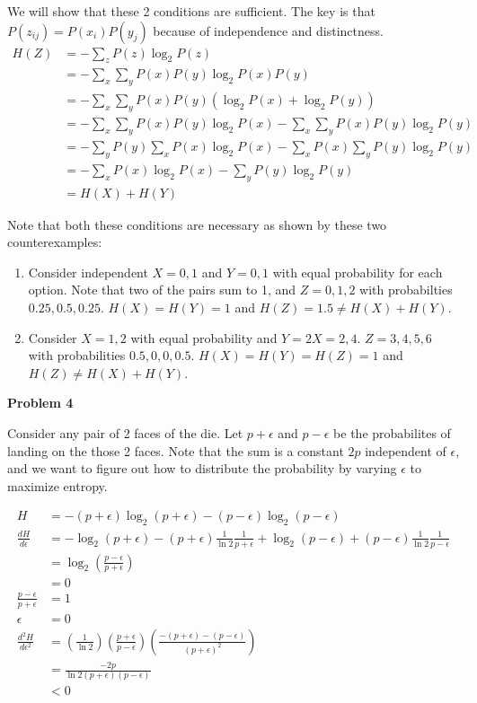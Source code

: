 \documentclass[11pt]{article}
\begin{document}
We will show that these 2 conditions are sufficient.  The key is that $P(z_{ij}) = P(x_i)P(y_j)$ because of independence and distinctness.
\begin{align*}
H(Z) &= - \sum_z P(z) \log_2 P(z)\\
&= - \sum_x \sum_y P(x)P(y) \log_2 P(x)P(y)\\
&= - \sum_x \sum_y P(x)P(y) \left( \log_2 P(x) +  \log_2 P(y) \right)\\
&= - \sum_x \sum_y P(x)P(y) \log_2 P(x) - \sum_x \sum_y P(x)P(y) \log_2 P(y)\\
&= - \sum_y P(y) \sum_x P(x) \log_2 P(x) - \sum_x P(x) \sum_y P(y) \log_2 P(y)\\
&= - \sum_x P(x) \log_2 P(x) - \sum_y P(y) \log_2 P(y)\\
&= H(X) + H(Y)
\end{align*}

\pagebreak

Note that both these conditions are necessary as shown by these two counterexamples:
\begin{enumerate}
\item Consider independent $X = {0, 1}$ and $Y = {0, 1}$ with equal probability for each option.  Note that two of the pairs sum to 1, and $Z = {0, 1, 2}$ with probabilties ${0.25, 0.5, 0.25}$.  $H(X) = H(Y) = 1$ and $H(Z) = 1.5 \ne H(X) + H(Y)$.
\item Consider $X = {1, 2}$ with equal probability and $Y = 2X = {2, 4}$.  $Z = {3, 4, 5, 6}$ with probabilities ${0.5, 0, 0, 0.5}$.  $H(X) = H(Y) = H(Z) = 1$ and $H(Z) \ne H(X) + H(Y)$.
\end{enumerate}

\medskip

\noindent \textbf{Problem 4}

Consider any pair of 2 faces of the die.  Let $p + \epsilon$ and $p - \epsilon$ be the probabilites of landing on the those 2 faces.  Note that the sum is a constant $2p$ independent of $\epsilon$, and we want to figure out how to distribute the probability by varying $\epsilon$ to maximize entropy.

\begin{align*}
H &= - (p + \epsilon) \log_2 (p + \epsilon) - (p - \epsilon) \log_2 (p - \epsilon)\\
\frac{dH}{d\epsilon} &= - \log_2 (p + \epsilon) - (p + \epsilon) \frac{1}{\ln 2} \frac{1}{p + \epsilon} + \log_2 (p - \epsilon) + (p - \epsilon) \frac{1}{\ln 2} \frac{1}{p - \epsilon}\\
&= \log_2 \left( \frac{p - \epsilon}{p + \epsilon} \right)\\
&= 0\\
\frac{p - \epsilon}{p + \epsilon} &= 1\\
\epsilon &= 0\\
\frac{d^2H}{d\epsilon^2} &= \left( \frac{1}{\ln 2} \right) \left( \frac{p + \epsilon}{p - \epsilon} \right) \left( \frac{-(p + \epsilon)-(p - \epsilon)}{(p + \epsilon)^2} \right)\\
&= \frac{-2p}{\ln 2(p + \epsilon)(p - \epsilon)}\\
&< 0
\end{align*}
\end{document}
